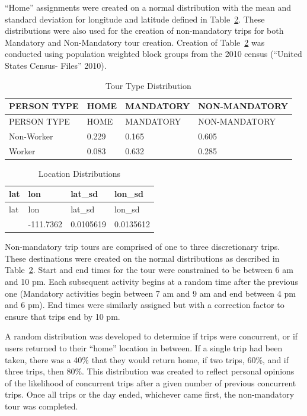 \documentclass[
  letterpaper,
  DIV=11,
  numbers=noendperiod]{scrartcl}
\begin{document}
``Home'' assignments were created on a normal distribution with the mean
and standard deviation for longitude and latitude defined in
Table~\ref{tbl-locdist}. These distributions were also used for the
creation of non-mandatory trips for both Mandatory and Non-Mandatory
tour creation. Creation of Table~\ref{tbl-locdist} was conducted using
population weighted block groups from the 2010 census ({``United
{States} {Census}- {Files}''} 2010).

\hypertarget{tbl-tourtypedist}{}
\begin{longtable}[]{@{}llll@{}}
\caption{\label{tbl-tourtypedist}Tour Type Distribution}\tabularnewline
\toprule\noalign{}
PERSON TYPE & HOME & MANDATORY & NON-MANDATORY \\
\midrule\noalign{}
\endfirsthead
\toprule\noalign{}
PERSON TYPE & HOME & MANDATORY & NON-MANDATORY \\
\midrule\noalign{}
\endhead
\bottomrule\noalign{}
\endlastfoot
Non-Worker & 0.229 & 0.165 & 0.605 \\
Worker & 0.083 & 0.632 & 0.285 \\
\end{longtable}

\hypertarget{tbl-locdist}{}
\begin{longtable}[]{@{}llll@{}}
\caption{\label{tbl-locdist}Location Distributions}\tabularnewline
\toprule\noalign{}
lat & lon & lat\_sd & lon\_sd \\
\midrule\noalign{}
\endfirsthead
\toprule\noalign{}
lat & lon & lat\_sd & lon\_sd \\
\midrule\noalign{}
\endhead
\bottomrule\noalign{}
\endlastfoot
40.03375 & -111.7362 & 0.0105619 & 0.0135612 \\
\end{longtable}

Non-mandatory trip tours are comprised of one to three discretionary
trips. These destinations were created on the normal distributions as
described in Table~\ref{tbl-locdist}. Start and end times for the tour
were constrained to be between 6 am and 10 pm. Each subsequent activity
begins at a random time after the previous one (Mandatory activities
begin between 7 am and 9 am and end between 4 pm and 6 pm). End times
were similarly assigned but with a correction factor to ensure that
trips end by 10 pm.

A random distribution was developed to determine if trips were
concurrent, or if users returned to their ``home'' location in between.
If a single trip had been taken, there was a 40\% that they would return
home, if two trips, 60\%, and if three trips, then 80\%. This
distribution was created to reflect personal opinions of the likelihood
of concurrent trips after a given number of previous concurrent trips.
Once all trips or the day ended, whichever came first, the non-mandatory
tour was completed.
\end{document}
